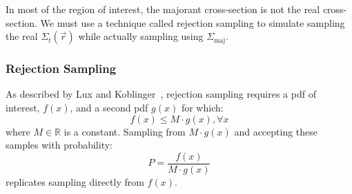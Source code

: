 In most of the region of interest, the majorant cross-section is not
the real cross-section. We must use a technique called rejection
sampling to simulate sampling the real $\Sigma_t(\vec{r})$ while
actually sampling using $\Sigma_\mathrm{maj}$. 

\subsubsection{Rejection Sampling}
\label{sec:rejection_sampling}
As described by Lux and
Koblinger~\cite{lux1991}, rejection sampling requires a \gls{pdf} of
interest, $f(x)$, and a second \gls{pdf} $g(x)$ for which:
\begin{equation}
  \label{eq:Mleq}
  f(x) \leq M\cdot g(x), \forall x
\end{equation} where $M \in \mathbb{R}$ is a constant.
Sampling from $M\cdot g(x)$ and accepting these samples with probability:
\begin{equation}
  \label{eq:preal}
  P = \frac{f(x)}{M\cdot g(x)}
\end{equation}
replicates sampling directly from $f(x)$. 

